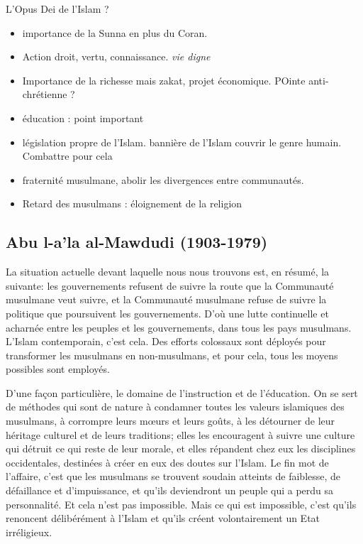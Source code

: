 \begin{Synthesis}
L'Opus Dei de l'Islam ?

\begin{itemize}
    \item  importance de la Sunna en plus du Coran.  

    \item  Action droit, vertu, connaissance.  \textit{vie digne}

    \item  Importance de la richesse mais zakat, projet économique. POinte anti-chrétienne ?

    \item éducation : point important
    
    \item législation propre de l'Islam. bannière de l'Islam couvrir le genre humain. Combattre pour cela
    
    \item fraternité musulmane, abolir les divergences entre communautés.
    
    \item Retard des musulmans : éloignement de la religion
    
\end{itemize}
\end{Synthesis}

\hypertarget{abu-l-ala-al-mawdudi-1903-1979}{%
\subsection{\texorpdfstring{{Abu l-a'la al-Mawdudi
(1903-1979)}}{Abu l-a'la al-Mawdudi (1903-1979)}}\label{abu-l-ala-al-mawdudi-1903-1979}}


La situation actuelle devant laquelle nous nous trouvons est, en résumé,
la suivante: les gouvernements refusent de suivre la route que la
Communauté musulmane veut suivre, et la Communauté musulmane refuse de
suivre la politique que poursuivent les gouvernements. D'où une lutte
continuelle et acharnée entre les peuples et les gouvernements, dans
tous les pays musulmans. L'Islam contemporain, c'est cela. Des efforts
colossaux sont déployés pour transformer les musulmans en non-musulmans,
et pour cela, tous les moyens possibles sont employés.

D'une façon particulière, le domaine de l'instruction et de l'éducation.
On se sert de méthodes qui sont de nature à condamner toutes les valeurs
islamiques des musulmans, à corrompre leurs mœurs et leurs goûts, à les
détourner de leur héritage culturel et de leurs traditions; elles les
encouragent à suivre une culture qui détruit ce qui reste de leur
morale, et elles répandent chez eux les disciplines occidentales,
destinées à créer en eux des doutes sur l'Islam. Le fin mot de
l'affaire, c'est que les musulmans se trouvent soudain atteints de
faiblesse, de défaillance et d'impuissance, et qu'ils deviendront un
peuple qui a perdu sa personnalité. Et cela n'est pas impossible. Mais
ce qui est impossible, c'est qu'ils renoncent délibérément à l'Islam et
qu'ils créent volontairement un Etat irréligieux.

